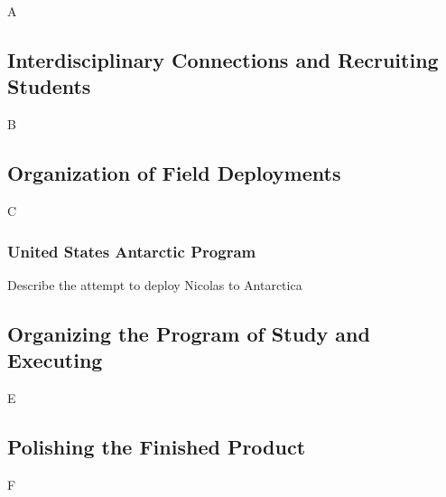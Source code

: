 \documentclass[../../../main.tex]{subfiles}
\begin{document}
A

\subsection{Interdisciplinary Connections and Recruiting Students}

B

\subsection{Organization of Field Deployments}

C

\subsubsection{United States Antarctic Program}

Describe the attempt to deploy Nicolas to Antarctica

\subsection{Organizing the Program of Study and Executing}

E

\subsection{Polishing the Finished Product}

F
\end{document}
